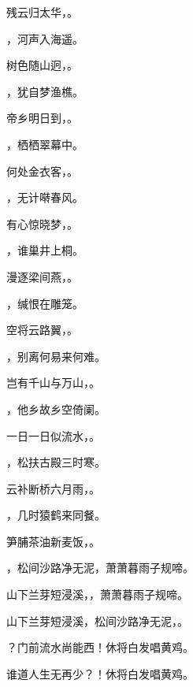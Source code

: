 \documentclass[12pt, a4paper, addpoints]{exam}
\begin{document}
\begin{questions}
\question[1] 残云归太华，\uline{\qquad\qquad\qquad}。

\question[1] \uline{\qquad\qquad\qquad}，河声入海遥。

\question[1] 树色随山迥，\uline{\qquad\qquad\qquad}。

\question[1] \uline{\qquad\qquad\qquad}，犹自梦渔樵。

\question[1] 帝乡明日到，\uline{\qquad\qquad\qquad}。

\question[1] \uline{\qquad\qquad\qquad}，栖栖翠幕中。

\question[1] 何处金衣客，\uline{\qquad\qquad\qquad}。

\question[1] \uline{\qquad\qquad\qquad}，无计啭春风。

\question[1] 有心惊晓梦，\uline{\qquad\qquad\qquad}。

\question[1] \uline{\qquad\qquad\qquad}，谁巢井上桐。

\question[1] 漫逐梁间燕，\uline{\qquad\qquad\qquad}。

\question[1] \uline{\qquad\qquad\qquad}，缄恨在雕笼。

\question[1] 空将云路翼，\uline{\qquad\qquad\qquad}。

\question[1] \uline{\qquad\qquad\qquad}，别离何易来何难。

\question[1] 岂有千山与万山，\uline{\qquad\qquad\qquad}。

\question[1] \uline{\qquad\qquad\qquad}，他乡故乡空倚阑。

\question[1] 一日一日似流水，\uline{\qquad\qquad\qquad}。

\question[1] \uline{\qquad\qquad\qquad}，松扶古殿三时寒。

\question[1] 云补断桥六月雨，\uline{\qquad\qquad\qquad}。

\question[1] \uline{\qquad\qquad\qquad}，几时猿鹤来同餐。

\question[1] 笋脯茶油新麦饭，\uline{\qquad\qquad\qquad}。

\question[1] \uline{\qquad\qquad\qquad}，松间沙路净无泥，萧萧暮雨子规啼。

\question[1] 山下兰芽短浸溪，\uline{\qquad\qquad\qquad}，萧萧暮雨子规啼。

\question[1] 山下兰芽短浸溪，松间沙路净无泥，\uline{\qquad\qquad\qquad}。

\question[1] \uline{\qquad\qquad\qquad}？门前流水尚能西！休将白发唱黄鸡。

\question[1] 谁道人生无再少？\uline{\qquad\qquad\qquad}！休将白发唱黄鸡。


\end{questions}
\end{document}
